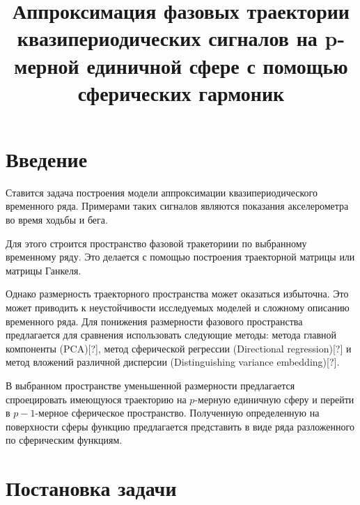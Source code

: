 \documentclass[12pt,twoside]{article}
\title
    [Аппроксимация фазовой траектории] 
    {Аппроксимация фазовых траектории квазипериодических сигналов на p-мерной единичной сфере с помощью сферических гармоник}
\begin{document}
\newcommand{\nsymbol}[2]{\medskip\hangindent=\parindent\hangafter=1\noindent $#1$ --- #2\par}
\newcommand{\nsymbolp}[3]{\nsymbol{#1}{#2 \dotfill\pageref{#3}}}

\maketitle

\section{Введение}
	Ставится задача построения модели аппроксимации квазипериодического временного ряда. Примерами таких сигналов являются показания акселерометра во время ходьбы и бега. 
	
	Для этого строится пространство фазовой тракеториии по выбранному временному ряду.  Это делается с помощью построения траекторной матрицы или матрицы Ганкеля. 
	
	Однако размерность траекторного пространства может оказаться избыточна. Это может приводить к неустойчивости исследуемых моделей и сложному описанию временного ряда. Для понижения размерности фазового пространства предлагается для сравнения использовать  следующие методы: метода главной компоненты (PCA)[?], метод сферической регрессии (Directional regression)[?] и метод вложений различной дисперсии (Distinguishing variance embedding)[?].
	
	В выбранном пространстве уменьшенной размерности предлагается спроецировать имеющуюся траекторию на $p$-мерную единичную сферу и перейти в $p-1$-мерное сферическое пространство. Полученную определенную на поверхности сферы функцию предлагается представить в виде ряда разложенного по сферическим функциям.
	
	


\section{Постановка задачи}
		
\end{document}
